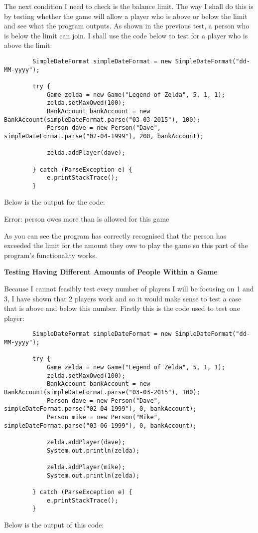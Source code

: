 \documentclass[a4paper]{article}
\begin{document}
The next condition I need to check is the balance limit. The way I shall do this is by testing whether the game will allow a player who is above or below the limit and see what the program outputs. As shown in the previous test, a person who is below the limit can join. I shall use the code below to test for a player who is above the limit: \begin{lstlisting}
		SimpleDateFormat simpleDateFormat = new SimpleDateFormat("dd-MM-yyyy");

        try {
            Game zelda = new Game("Legend of Zelda", 5, 1, 1);
            zelda.setMaxOwed(100);
            BankAccount bankAccount = new BankAccount(simpleDateFormat.parse("03-03-2015"), 100);
            Person dave = new Person("Dave", simpleDateFormat.parse("02-04-1999"), 200, bankAccount);

            zelda.addPlayer(dave);

        } catch (ParseException e) {
            e.printStackTrace();
        }
\end{lstlisting}
Below is the output for the code: \newline

\noindent Error: person owes more than is allowed for this game \newline

As you can see the program has correctly recognised that the person has exceeded the limit for the amount they owe to play the game so this part of the program's functionality works. \newline

\noindent \textbf{Testing Having Different Amounts of People Within a Game} 

Because I cannot feasibly test every number of players I will be focusing on 1 and 3, I have shown that 2 players work and so it would make sense to test a case that is above and below this number. Firstly this is the code used to test one player: \begin{lstlisting}
		SimpleDateFormat simpleDateFormat = new SimpleDateFormat("dd-MM-yyyy");

        try {
            Game zelda = new Game("Legend of Zelda", 5, 1, 1);
            zelda.setMaxOwed(100);
            BankAccount bankAccount = new BankAccount(simpleDateFormat.parse("03-03-2015"), 100);
            Person dave = new Person("Dave", simpleDateFormat.parse("02-04-1999"), 0, bankAccount);
            Person mike = new Person("Mike", simpleDateFormat.parse("03-06-1999"), 0, bankAccount);

            zelda.addPlayer(dave);
            System.out.println(zelda);

            zelda.addPlayer(mike);
            System.out.println(zelda);

        } catch (ParseException e) {
            e.printStackTrace();
        }
\end{lstlisting}
Below is the output of this code: \newline
\end{document}
